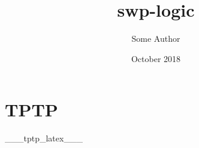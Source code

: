 \documentclass[11pt,a4paper,english]{article}
\title{swp-logic}
\author{Some Author}
\date{October 2018}
\begin{document}
\section{TPTP}

___tptp_latex___
\end{document}
